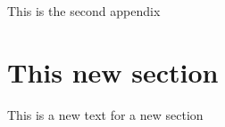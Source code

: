 \chaptercustompageintoctikz[false]%
						   {\SecondAppendixTitleTopLine}%
						   {\SecondAppendixTitleBottomLine}%
						   {\thepage}%
\label{appendix:mumax-script-example-appendix-ii}
\appendix{}
\protect\thispagestyle{phdfancyspecialappendixmain}

This is the second appendix

\section{This new section}
\label{sec:section-appenmdix-ii}

This is a new text for a new section